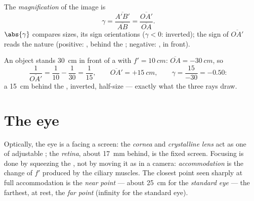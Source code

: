 \begin{definition}[Magnification]\label{def:g11:lenses-and-eye:magnification}
The \emph{magnification} of the image is
\[
\gamma = \frac{\overline{A'B'}}{\overline{AB}}
       = \frac{\overline{OA'}}{\overline{OA}} .
\]
$\abs{\gamma}$ compares sizes, its sign orientations ($\gamma < 0$:
inverted); the sign of $\overline{OA'}$ reads the nature (positive:
, behind the ; negative: , in front).
\end{definition}

\begin{example}\label{ex:g11:lenses-and-eye:conjugate}
An object stands \qty{30}{cm} in front of a  with
$f' = \qty{10}{cm}$: $\overline{OA} = \qty{-30}{cm}$, so
\[
\frac{1}{\overline{OA'}} = \frac{1}{10} - \frac{1}{30} = \frac{1}{15},
\qquad \overline{OA'} = +\qty{15}{cm},
\qquad \gamma = \frac{15}{-30} = -0.50 :
\]
a  \qty{15}{cm} behind the , inverted, half-size ---
exactly what the three rays draw.
\end{example}

\section{The eye}

\begin{definition}\label{def:g11:lenses-and-eye:eye}
Optically, the eye is a  facing a screen: the
\emph{cornea} and \emph{crystalline lens} act as one  of adjustable ; the
\emph{retina}, about \qty{17}{mm} behind, is the fixed
screen. Focusing is done by squeezing the , not by moving it as in
a camera: \emph{accommodation} is the change of
$f'$ produced by the ciliary muscles. The closest point seen sharply at full
accommodation is the \emph{near point} --- about
\qty{25}{cm} for the \emph{standard eye} --- the
farthest, at rest, the \emph{far point} (infinity for
the standard eye).
\end{definition}

